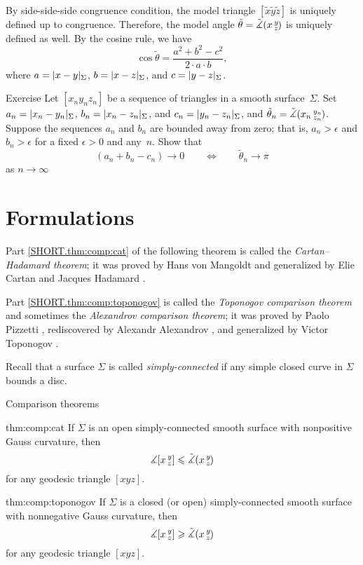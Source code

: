 By side-side-side congruence condition,
the model triangle $[\tilde x\tilde y\tilde z]$ is uniquely defined up to congruence.
Therefore, the model angle $\tilde\theta=\tilde\measuredangle(x\,{}^{y}_{z}\hspace{-0.2ex})$ is uniquely defined as well.
By the cosine rule, we have 
\[\cos \tilde\theta=\frac{a^2+b^2-c^2}{2\cdot a \cdot b},\]
where $a=\dist{x}{y}{\Sigma}$, $b=\dist{x}{z}{\Sigma}$, and $c=\dist{y}{z}{\Sigma}$.

\begin{thm}{Exercise}\label{ex:wide-hinges}
Let $[x_ny_nz_n]$ be a sequence of triangles in a smooth surface~$\Sigma$.
Set $a_n=\dist{x_n}{y_n}{\Sigma}$,
$b_n=\dist{x_n}{z_n}{\Sigma}$,
and $c_n=\dist{y_n}{z_n}{\Sigma}$, and $\tilde\theta_n=\tilde\measuredangle(x_n\,{}^{y_n}_{z_n}\hspace{-0.2ex})$.
Suppose the sequences $a_n$ and $b_n$ are bounded away from zero;
that is, $a_n>\epsilon$ and $b_n>\epsilon$ for a fixed $\epsilon>0$ and any~$n$.
Show that
\[(a_n+b_n-c_n)\to 0\qquad\iff\qquad \tilde\theta_n\to \pi\]
as $n\to\infty$
\end{thm}

\section{Formulations}

Part \ref{SHORT.thm:comp:cat} of the following theorem is called the {}\emph{Cartan--Hadamard theorem};
it was proved by 
Hans von Mangoldt \cite{mangoldt} and generalized by 
Elie Cartan \cite{cartan} and
Jacques Hadamard \cite{hadamard}.

Part \ref{SHORT.thm:comp:toponogov} is called the {}\emph{Toponogov comparison theorem} and sometimes the {}\emph{Alexandrov comparison theorem};
it was proved by Paolo Pizzetti \cite{pizzetti}, rediscovered by Alexandr Alexandrov \cite{aleksandrov}, and 
generalized by Victor Toponogov \cite{toponogov1957}.%

Recall that a surface $\Sigma$ is called \emph{simply-connected} if any simple closed curve in $\Sigma$ bounds a disc.

\begin{thm}{Comparison theorems}
\label{thm:comp}
\ 

\begin{subthm}{thm:comp:cat}
If $\Sigma$ is an open simply-connected  smooth surface with nonpositive Gauss curvature, then 
\[\measuredangle[x\,{}^{y}_{z}]\leqslant\tilde\measuredangle(x\,{}^{y}_{z}\hspace{-0.2ex})\]
for any geodesic triangle $[xyz]$.
\end{subthm}

\begin{subthm}{thm:comp:toponogov}
If $\Sigma$ is a closed (or open) simply-connected smooth surface with nonnegative Gauss curvature, then 
 \[\measuredangle[x\,{}^{y}_{z}]\geqslant\tilde\measuredangle(x\,{}^{y}_{z}\hspace{-0.2ex})\]
for any geodesic triangle $[xyz]$.
\end{subthm}

\end{thm}

